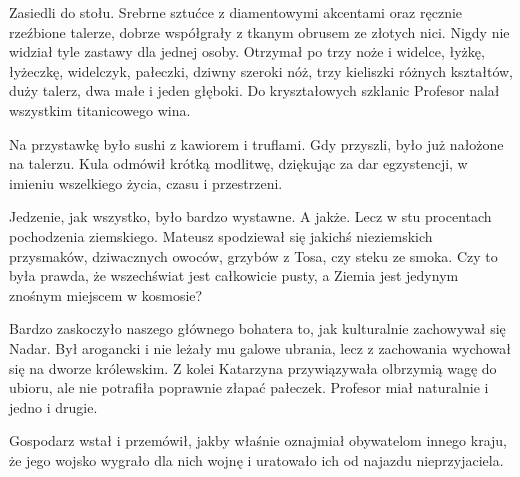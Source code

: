 \divider{}

Zasiedli do stołu. Srebrne sztućce z diamentowymi akcentami oraz ręcznie rzeźbione talerze, dobrze współgrały z tkanym obrusem ze złotych nici.
Nigdy nie widział tyle zastawy dla jednej osoby. 
Otrzymał po trzy noże i widelce, łyżkę, łyżeczkę, widelczyk, pałeczki, dziwny szeroki nóż, trzy kieliszki różnych kształtów, duży talerz, dwa małe i jeden głęboki.
Do kryształowych szklanic Profesor nalał wszystkim titanicowego wina.

Na przystawkę było sushi z kawiorem i truflami. Gdy przyszli, było już nałożone na talerzu. 
Kula odmówił krótką modlitwę, dziękując za dar egzystencji, w imieniu wszelkiego życia, czasu i przestrzeni.

Jedzenie, jak wszystko, było bardzo wystawne. A jakże. Lecz w stu procentach pochodzenia ziemskiego.
Mateusz spodziewał się jakichś nieziemskich przysmaków, dziwacznych owoców, grzybów z Tosa, czy steku ze smoka.
Czy to była prawda, że wszechświat jest całkowicie pusty, a Ziemia jest jedynym znośnym miejscem w kosmosie?

Bardzo zaskoczyło naszego głównego bohatera to, jak kulturalnie zachowywał się Nadar. Był arogancki i nie leżały mu galowe ubrania, lecz z zachowania wychował się na dworze królewskim.
Z kolei Katarzyna przywiązywała olbrzymią wagę do ubioru, ale nie potrafiła poprawnie złapać pałeczek.
Profesor miał naturalnie i jedno i drugie.

Gospodarz wstał i przemówił, jakby właśnie oznajmiał obywatelom innego kraju, że jego wojsko wygrało dla nich wojnę i uratowało ich od najazdu nieprzyjaciela.

